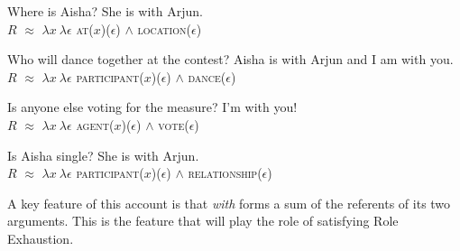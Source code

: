 \documentclass[twoside, 12pt]{article}
\begin{document}
\begin{exe}
\raggedright
  \ex \label{ex:R}
  \begin{xlist}
    \ex
    \begin{xlist}
     Where is Aisha?
     She is with Arjun.\\ $R$ $\approx$ $\lambda x\ \lambda \epsilon$ \textsc{at}($x$)($\epsilon$) $\wedge$ \textsc{location}($\epsilon$)
    \end{xlist}
    \ex
    \begin{xlist}
       Who will dance together at the contest?
       Aisha is with Arjun and I am with you.\\ $R$ $\approx$ $\lambda x\ \lambda \epsilon$ \textsc{participant}($x$)($\epsilon$) $\wedge$ \textsc{dance}($\epsilon$)
    \end{xlist}
    \ex 
    \begin{xlist}
       Is anyone else voting for the measure?
       I'm with you!\\ $R$ $\approx$ $\lambda x\ \lambda \epsilon$ \textsc{agent}($x$)($\epsilon$) $\wedge$ \textsc{vote}($\epsilon$)
    \end{xlist}
    \ex 
    \begin{xlist}
       Is Aisha single?
       She is with Arjun.\\ $R$ $\approx$ $\lambda x\ \lambda \epsilon$ \textsc{participant}($x$)($\epsilon$) $\wedge$ \textsc{relationship}($\epsilon$)
    \end{xlist}
  \end{xlist}
\end{exe}
A key feature of this account is that \textit{with} forms a sum of the referents of its two arguments. This is the feature that will play the role of satisfying Role Exhaustion.
\end{document}
